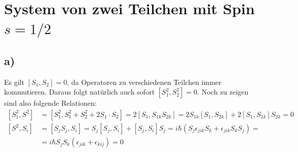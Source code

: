 \documentclass[a4paper,12pt]{article}
\newcommand{\kla}{}
\newcommand{\klam}{}
\begin{document}
\section{System von zwei Teilchen mit Spin $s=1/2$}
\subsection*{a)}
Es gilt $\klam\left[ {S_1,S_2} \right]=0$, da Operatoren zu verschiedenen Teilchen immer kommutieren. Daraus folgt natürlich auch sofort $\klam\left[ {S_1^2,S_2^2} \right]=0$. Noch zu zeigen sind also folgende Relationen:
\begin{align*}
\klam\left[ {S_1^2,S^2} \right]&=\klam\left[ {S_1^2,S_1^2+S_2^2+2S_1\cdot S_2} \right]=2\klam\left[ {S_1,S_{1k}S_{2k}} \right]=2S_{1k}\klam\left[ {S_1,S_{2k}} \right]+2\klam\left[ {S_1,S_{1k}} \right]S_{2k}=0\\
\klam\left[ {S^2,S_i} \right]&=\klam\left[ {S_jS_j,S_i} \right]=S_j\klam\left[ {S_j,S_i} \right]+\klam\left[ {S_j,S_i} \right]S_j=i\hbar\kla\left( {S_j\epsilon_{jik}S_k+\epsilon_{jik}S_kS_j} \right)= \\
&=i\hbar S_jS_k\kla\left( {\epsilon_{jik}+\epsilon_{kij}} \right)=0
\end{align*}
\end{document}
